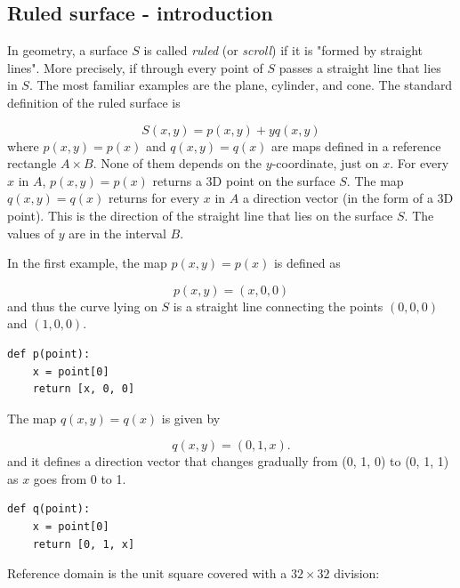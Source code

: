 \subsection{Ruled surface - introduction}

In geometry, a surface $S$ is called {\em ruled} (or {\em scroll}) if it is "formed by straight lines".
More precisely, if through every point of $S$ passes a straight line that lies in $S$. 
The most familiar examples are the plane, cylinder, and 
cone. The standard definition of the ruled surface is 

$$
S(x, y) = p(x, y) + yq(x, y)
$$
where $p(x, y) = p(x)$ and $q(x, y) = q(x)$ are maps defined in a reference rectangle 
$A \times B$. None of them depends on the $y$-coordinate, just on $x$. For every $x$ in 
$A$, $p(x, y) = p(x)$ returns a 3D point on the surface $S$. The map $q(x, y) = q(x)$ returns 
for every $x$ in $A$ a direction vector (in the form of a 3D point). This is the direction 
of the straight line that lies on the surface $S$. The values of $y$ are in the interval $B$.

In the first example, the map $p(x, y) = p(x)$ is defined as

$$
p(x, y) = (x, 0, 0)
$$
and thus the curve lying on $S$ is a straight line connecting the points 
$(0, 0, 0)$ and $(1, 0, 0)$. \\

\begin{bbox}
\begin{verbatim}
def p(point):
    x = point[0]
    return [x, 0, 0]
\end{verbatim}
\end{bbox}
\vspace{6mm}

\noindent
The map $q(x, y) = q(x)$ is given by

$$
q(x, y) = (0, 1, x).
$$
and it defines a direction vector that changes gradually from 
(0, 1, 0) to (0, 1, 1) as $x$ goes from 0 to 1.\\

\begin{bbox}
\begin{verbatim}
def q(point):
    x = point[0]
    return [0, 1, x]
\end{verbatim}
\end{bbox}
\vspace{6mm}

\noindent
Reference domain is the unit square covered with a $32 \times 32$
division:\\

